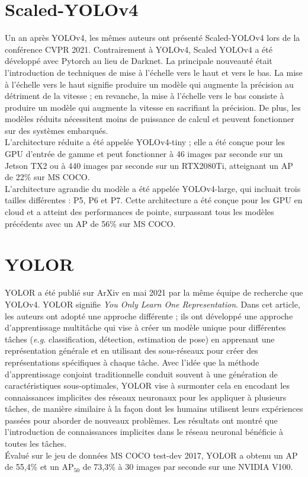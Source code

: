 \documentclass{article}
\begin{document}
\section{Scaled-YOLOv4}
Un an après YOLOv4, les mêmes auteurs ont présenté Scaled-YOLOv4 \cite{73} lors de la conférence CVPR 2021. Contrairement à YOLOv4, Scaled YOLOv4 a été développé avec Pytorch au lieu de Darknet. La principale nouveauté était l'introduction de techniques de mise à l'échelle vers le haut et vers le bas. La mise à l'échelle vers le haut signifie produire un modèle qui augmente la précision au détriment de la vitesse ; en revanche, la mise à l'échelle vers le bas consiste à produire un modèle qui augmente la vitesse en sacrifiant la précision. De plus, les modèles réduits nécessitent moins de puissance de calcul et peuvent fonctionner sur des systèmes embarqués.
\vspace{.2cm}\\
L'architecture réduite a été appelée YOLOv4-tiny ; elle a été conçue pour les GPU d'entrée de gamme et peut fonctionner à 46 images par seconde sur un Jetson TX2 ou à 440 images par seconde sur un RTX2080Ti, atteignant un AP de 22\% sur MS COCO.
\vspace{.2cm}\\
L'architecture agrandie du modèle a été appelée YOLOv4-large, qui incluait trois tailles différentes : P5, P6 et P7. Cette architecture a été conçue pour les GPU en cloud et a atteint des performances de pointe, surpassant tous les modèles précédents \cite{74,75,76} avec un AP de 56\% sur MS COCO.


\section{YOLOR}
YOLOR \cite{77} a été publié sur ArXiv en mai 2021 par la même équipe de recherche que YOLOv4. YOLOR signifie \textit{You Only Learn One Representation}. Dans cet article, les auteurs ont adopté une approche différente ; ils ont développé une approche d'apprentissage multitâche qui vise à créer un modèle unique pour différentes tâches (\textit{e.g.} classification, détection, estimation de pose) en apprenant une représentation générale et en utilisant des sous-réseaux pour créer des représentations spécifiques à chaque tâche. Avec l'idée que la méthode d'apprentissage conjoint traditionnelle conduit souvent à une génération de caractéristiques sous-optimales, YOLOR vise à surmonter cela en encodant les connaissances implicites des réseaux neuronaux pour les appliquer à plusieurs tâches, de manière similaire à la façon dont les humains utilisent leurs expériences passées pour aborder de nouveaux problèmes. Les résultats ont montré que l'introduction de connaissances implicites dans le réseau neuronal bénéficie à toutes les tâches.
\vspace{.2cm}\\
Évalué sur le jeu de données MS COCO test-dev 2017, YOLOR a obtenu un AP de 55,4\% et un AP$_{50}$ de 73,3\% à 30 images par seconde sur une NVIDIA V100.
\end{document}
